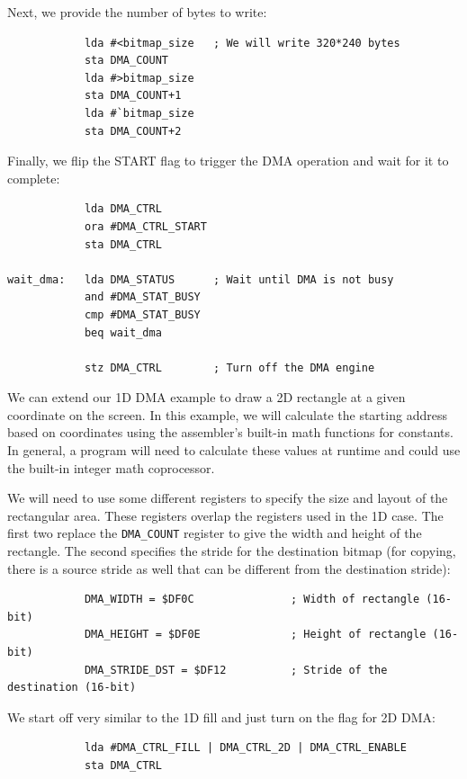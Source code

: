 Next, we provide the number of bytes to write:

\begin{verbatim}
            lda #<bitmap_size   ; We will write 320*240 bytes
            sta DMA_COUNT
            lda #>bitmap_size
            sta DMA_COUNT+1
            lda #`bitmap_size
            sta DMA_COUNT+2
\end{verbatim}

Finally, we flip the START flag to trigger the DMA operation and wait for it to complete:

\begin{verbatim}
            lda DMA_CTRL
            ora #DMA_CTRL_START
            sta DMA_CTRL

wait_dma:   lda DMA_STATUS      ; Wait until DMA is not busy
            and #DMA_STAT_BUSY
            cmp #DMA_STAT_BUSY
            beq wait_dma

            stz DMA_CTRL        ; Turn off the DMA engine
\end{verbatim}

\label{ex:dma_2d}

We can extend our 1D DMA example to draw a 2D rectangle at a given coordinate on the screen. In this example, we will calculate the starting address based on coordinates using the assembler's built-in math functions for constants. In general, a program will need to calculate these values at runtime and could use the built-in integer math coprocessor.

We will need to use some different registers to specify the size and layout of the rectangular area. These registers overlap the registers used in the 1D case. The first two replace the \verb+DMA_COUNT+ register to give the width and height of the rectangle. The second specifies the stride for the destination bitmap (for copying, there is a source stride as well that can be different from the destination stride):

\begin{verbatim}
            DMA_WIDTH = $DF0C               ; Width of rectangle (16-bit)
            DMA_HEIGHT = $DF0E              ; Height of rectangle (16-bit)
            DMA_STRIDE_DST = $DF12          ; Stride of the destination (16-bit)
\end{verbatim}

We start off very similar to the 1D fill and just turn on the flag for 2D DMA:

\begin{verbatim}
            lda #DMA_CTRL_FILL | DMA_CTRL_2D | DMA_CTRL_ENABLE
            sta DMA_CTRL
\end{verbatim}

